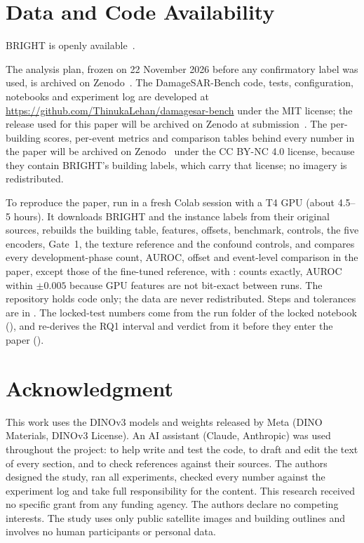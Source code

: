 \documentclass[journal]{IEEEtran}
\begin{document}
\section*{Data and Code Availability}
\label{sec:availability}
BRIGHT is openly available~\cite{chen2025bright,chen2026brightzenodo}.

The analysis plan, frozen on 22 November 2026 before any confirmatory label was used, is archived on Zenodo~\cite{lehan2026prereg}. The DamageSAR-Bench code, tests, configuration, notebooks and experiment log are developed at \url{https://github.com/ThinukaLehan/damagesar-bench} under the MIT license; the release used for this paper will be archived on Zenodo at submission~\cite{lehan2026code}. The per-building scores, per-event metrics and comparison tables behind every number in the paper will be archived on Zenodo~\cite{lehan2026data} under the CC BY-NC 4.0 license, because they contain BRIGHT's building labels, which carry that license; no imagery is redistributed.

 To reproduce the paper, run  in a fresh Colab session with a T4 GPU (about 4.5--5 hours). It downloads BRIGHT and the instance labels from their original sources, rebuilds the building table, features, offsets, benchmark, controls, the five encoders, Gate~1, the texture reference and the confound controls, and compares every development-phase count, AUROC, offset and event-level comparison in the paper, except those of the fine-tuned reference, with : counts exactly, AUROC within $\pm0.005$ because GPU features are not bit-exact between runs. The repository holds code only; the data are never redistributed. Steps and tolerances are in . The locked-test numbers come from the run folder of the locked notebook (), and  re-derives the RQ1 interval and verdict from it before they enter the paper ().

\section*{Acknowledgment}
This work uses the DINOv3 models and weights released by Meta (DINO Materials, DINOv3 License). An AI assistant (Claude, Anthropic) was used throughout the project: to help write and test the code, to draft and edit the text of every section, and to check references against their sources. The authors designed the study, ran all experiments, checked every number against the experiment log and take full responsibility for the content. This research received no specific grant from any funding agency. The authors declare no competing interests. The study uses only public satellite images and building outlines and involves no human participants or personal data.
\end{document}
